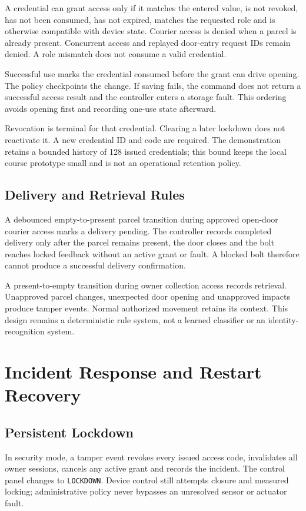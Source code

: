 \documentclass[conference,letterpaper]{IEEEtran}
\newcommand{\code}[1]{\texttt{\small #1}}
\begin{document}
A credential can grant access only if it matches the entered value, is not revoked, has not been consumed, has not expired, matches the requested role and is otherwise compatible with device state. Courier access is denied when a parcel is already present. Concurrent access and replayed door-entry request IDs remain denied. A role mismatch does not consume a valid credential.

Successful use marks the credential consumed before the grant can drive opening. The policy checkpoints the change. If saving fails, the command does not return a successful access result and the controller enters a storage fault. This ordering avoids opening first and recording one-use state afterward.

Revocation is terminal for that credential. Clearing a later lockdown does not reactivate it. A new credential ID and code are required. The demonstration retains a bounded history of 128 issued credentials; this bound keeps the local course prototype small and is not an operational retention policy.

\subsection{Delivery and Retrieval Rules}
A debounced empty-to-present parcel transition during approved open-door courier access marks a delivery pending. The controller records completed delivery only after the parcel remains present, the door closes and the bolt reaches locked feedback without an active grant or fault. A blocked bolt therefore cannot produce a successful delivery confirmation.

A present-to-empty transition during owner collection access records retrieval. Unapproved parcel changes, unexpected door opening and unapproved impacts produce tamper events. Normal authorized movement retains its context. This design remains a deterministic rule system, not a learned classifier or an identity-recognition system.

\section{Incident Response and Restart Recovery}
\subsection{Persistent Lockdown}
In security mode, a tamper event revokes every issued access code, invalidates all owner sessions, cancels any active grant and records the incident. The control panel changes to \code{LOCKDOWN}. Device control still attempts closure and measured locking; administrative policy never bypasses an unresolved sensor or actuator fault.
\end{document}
